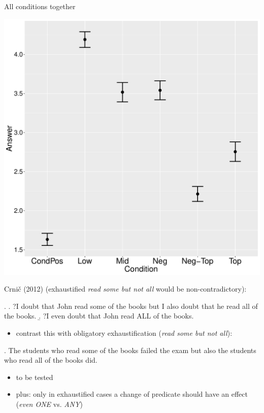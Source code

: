 \documentclass[ignorenonframetext,]{beamer}
\providecommand{\tightlist}{%
  \setlength{\itemsep}{0pt}\setlength{\parskip}{0pt}}
\begin{document}
\begin{frame}{All conditions together}

\begin{center}
\includegraphics[scale=0.3]{exp1-ani-part_1-2-errorbars.pdf}
\end{center}

\end{frame}


\begin{frame}

Crnič (2012) (exhaustified \Next[a] \emph{read some but not all} would
be non-contradictory):

\ex. \a. ?I doubt that John read some of the books but I also doubt that
he read all of the books. \b. ?I even doubt that John read ALL of the
books.


\begin{itemize}
\tightlist
\item
  contrast this with obligatory exhaustification (\emph{read some but
  not all}):
\end{itemize}

\ex. The students who read some of the books failed the exam but also
the students who read all of the books did.

\begin{itemize}
\tightlist
\item
  to be tested
\item
  plus: only in exhaustified cases a change of predicate should have an
  effect (\emph{even ONE} vs. \emph{ANY})
\end{itemize}
\end{frame}
\end{document}
